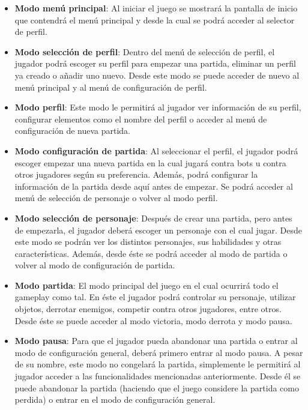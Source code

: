 \begin{itemize}
    \item \textbf{Modo menú principal}: Al iniciar el juego se mostrará la
    pantalla de inicio que contendrá el menú principal y desde la cual se podrá
    acceder al selector de perfil.

    \item \textbf{Modo selección de perfil}: Dentro del menú de selección de
    perfil, el jugador podrá escoger su perfil para empezar una partida,
    eliminar un perfil ya creado o añadir uno nuevo. Desde este modo se puede
    acceder de nuevo al menú principal y al menú de configuración de perfil.

    \item \textbf{Modo perfil}: Este modo le permitirá al jugador ver
    información de su perfil, configurar elementos como el nombre del perfil o
    acceder al menú de configuración de nueva partida.

    \item \textbf{Modo configuración de partida}: Al seleccionar el
    perfil, el jugador podrá escoger empezar una nueva partida en la cual jugará
    contra bots u contra otros jugadores según su preferencia. Además, podrá
    configurar la información de la partida desde aquí antes de empezar. Se
    podrá acceder al menú de selección de personaje o volver al modo perfil.

    \item \textbf{Modo selección de personaje}: Después de crear una partida,
    pero antes de empezarla, el jugador deberá escoger un personaje con el cual
    jugar. Desde este modo se podrán ver los distintos personajes, sus
    habilidades y otras características. Además, desde éste se podrá acceder al
    modo de partida o volver al modo de configuración de partida.

    \item \textbf{Modo partida}: El modo principal del juego en el cual ocurrirá
    todo el gameplay como tal. En éste el jugador podrá controlar su personaje,
    utilizar objetos, derrotar enemigos, competir contra otros jugadores, entre
    otros. Desde éste se puede acceder al modo victoria, modo derrota y modo
    pausa.

    \item \textbf{Modo pausa}: Para que el jugador pueda abandonar una partida o
    entrar al modo de configuración general, deberá primero entrar al modo
    pausa. A pesar de su nombre, este modo no congelará la partida, simplemente
    le permitirá al jugador acceder a las funcionalidades mencionadas
    anteriormente. Desde él se puede abandonar la partida (haciendo que el juego
    considere la partida como perdida) o entrar en el modo de configuración
    general.


\end{itemize}
